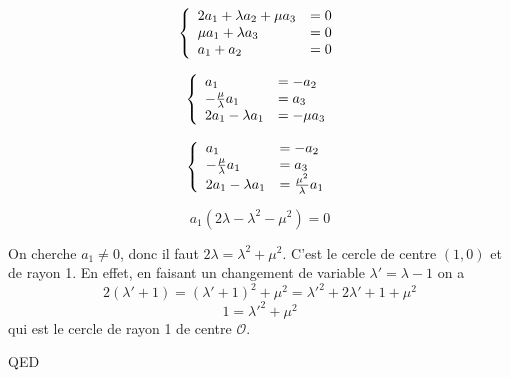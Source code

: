 \documentclass[]{book}
\theoremstyle{definition}
\begin{document}
$$ 
\left\{ 
\begin{array}{l l}
2a_1 + \lambda a_2 + \mu a_3 & = 0\\
\mu a_1 + \lambda a_3 & = 0\\
a_1 + a_2  & = 0\\
\end{array}
\right. 
$$ 

$$ 
\left\{ 
\begin{array}{l l}
a_1  & = - a_2\\
-\frac{\mu}{\lambda}a_1  & =  a_3\\
2a_1 - \lambda a_1 & =  -\mu a_3\\
\end{array}
\right. 
$$ 

$$ 
\left\{ 
\begin{array}{l l}
a_1  & = - a_2\\
-\frac{\mu}{\lambda}a_1  & =  a_3\\
2a_1 - \lambda a_1 & =  \frac{\mu^2}{\lambda}a_1\\
\end{array}
\right. 
$$ 

$$a_1(2\lambda -\lambda^2 - \mu^2) = 0 $$

On cherche $a_1 \neq 0$, donc il faut $2\lambda = \lambda^2 + \mu^2$. C'est le cercle de centre $(1,0)$ et de rayon 1.
En effet, en faisant un changement de variable $\lambda'= \lambda-1$ on a 
$$
2(\lambda'+1) = (\lambda'+1)^2+\mu^2 = \lambda'^2+2\lambda'+1+\mu^2$$
$$1=\lambda'^2+\mu^2$$
qui est le cercle de rayon 1 de centre $\mathscr{O}$.

QED
\end{document}
